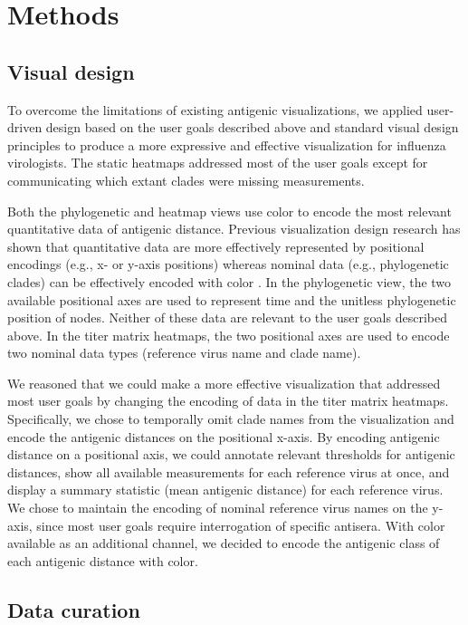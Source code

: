 \documentclass[utf8]{FrontiersinHarvard} %
\begin{document}
\section{Methods}

\subsection{Visual design}

To overcome the limitations of existing antigenic visualizations, we applied user-driven design based on the user goals described above and standard visual design principles to produce a more expressive and effective visualization for influenza virologists.
The static heatmaps addressed most of the user goals except for communicating which extant clades were missing measurements.

Both the phylogenetic and heatmap views use color to encode the most relevant quantitative data of antigenic distance.
Previous visualization design research has shown that quantitative data are more effectively represented by positional encodings (e.g., x- or y-axis positions) whereas nominal data (e.g., phylogenetic clades) can be effectively encoded with color \citep{Mackinlay1986}.
In the phylogenetic view, the two available positional axes are used to represent time and the unitless phylogenetic position of nodes.
Neither of these data are relevant to the user goals described above.
In the titer matrix heatmaps, the two positional axes are used to encode two nominal data types (reference virus name and clade name).

We reasoned that we could make a more effective visualization that addressed most user goals by changing the encoding of data in the titer matrix heatmaps.
Specifically, we chose to temporally omit clade names from the visualization and encode the antigenic distances on the positional x-axis.
By encoding antigenic distance on a positional axis, we could annotate relevant thresholds for antigenic distances, show all available measurements for each reference virus at once, and display a summary statistic (mean antigenic distance) for each reference virus.
We chose to maintain the encoding of nominal reference virus names on the y-axis, since most user goals require interrogation of specific antisera.
With color available as an additional channel, we decided to encode the antigenic class of each antigenic distance with color.

\subsection{Data curation}
\end{document}
